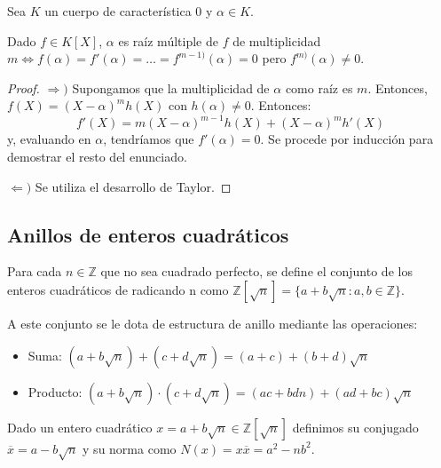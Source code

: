 \begin{proposition}
Sea $K$ un cuerpo de característica $0$ y $\alpha \in K$. 

Dado $f \in K[X]$, $\alpha$ es raíz múltiple de $f$ de multiplicidad $m \iff f(\alpha) = f'(\alpha) = \ldots = f^{m-1)}(\alpha) = 0$ pero $f^{m)}(\alpha) \neq 0$. 
\end{proposition}
\begin{proof}
$\Rightarrow)$ Supongamos que la multiplicidad de $\alpha$ como raíz es $m$. Entonces, $f(X) = (X-\alpha)^mh(X)$ con $h(\alpha) \neq 0$. Entonces: $$f'(X) = m(X-\alpha)^{m-1}h(X)+(X-\alpha)^mh'(X)$$ y, evaluando en $\alpha$, tendríamos que $f'(\alpha) = 0$. Se procede por inducción para demostrar el resto del enunciado. 

$\Leftarrow)$ Se utiliza el desarrollo de Taylor. 
\end{proof}

\subsection{Anillos de enteros cuadráticos}

\begin{definition}
Para cada $n \in \mathbb{Z}$ que no sea cuadrado perfecto, se define el conjunto de los enteros cuadráticos de radicando n como $\mathbb{Z}[\sqrt{n}] = \{a+b\sqrt{n}:a,b \in \mathbb{Z}\}$.

A este conjunto se le dota de estructura de anillo mediante las operaciones:

\begin{itemize}
\item Suma: $(a+b\sqrt{n})+(c+d\sqrt{n}) = (a+c) + (b+d)\sqrt{n}$
\item Producto: $(a+b\sqrt{n}) \cdot (c+d\sqrt{n}) = (ac+bdn)+(ad+bc)\sqrt{n}$
\end{itemize}

Dado un entero cuadrático $x = a + b \sqrt{n} \in \mathbb{Z}[\sqrt{n}]$ definimos su conjugado $\overline{x} = a - b \sqrt{n}$ y su norma como $N(x) = x \overline{x} = a^2-nb^2$. 
\end{definition}

